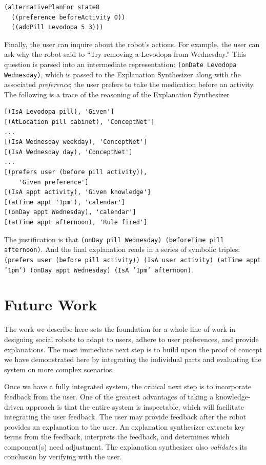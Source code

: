 \documentclass[letterpaper]{article} %
\begin{document}
\small{
\begin{verbatim}
(alternativePlanFor state8 
  ((preference beforeActivity 0)) 
  ((addPill Levodopa 5 3)))
\end{verbatim}}


Finally, the user can inquire about the robot's actions.  For example, the user can ask why the robot said to ``Try removing a Levodopa from Wednesday.''  This question is parsed into an intermediate representation: \texttt{(onDate Levodopa Wednesday)}, which is passed to the Explanation Synthesizer along with the associated \emph{preference}; the user prefers to take the medication before an activity.
The following is a trace of the reasoning of the Explanation Synthesizer

\small{
\begin{verbatim}
[(IsA Levodopa pill), 'Given']
[(AtLocation pill cabinet), 'ConceptNet']
...
[(IsA Wednesday weekday), 'ConceptNet']
[(IsA Wednesday day), 'ConceptNet']
...
[(prefers user (before pill activity)), 
    'Given preference']
[(IsA appt activity), 'Given knowledge']
[(atTime appt '1pm'), 'calendar']
[(onDay appt Wednesday), 'calendar']
[(atTime appt afternoon), 'Rule fired']
\end{verbatim}}

The justification is that \texttt{(onDay pill Wednesday) (beforeTime pill
afternoon)}.  And the final explanation reads in a series of symbolic
triples: \texttt{(prefers user (before pill activity)) (IsA user activity) (atTime appt '1pm') (onDay appt Wednesday) (IsA '1pm' afternoon)}.

\section{Future Work}
The work we describe here sets the foundation for a whole line of work in 
designing social robots to adapt to users, adhere to user preferences, and
provide explanations.  The most immediate next step is to build upon the
proof of concept we have demonstrated here by integrating the individual
parts and evaluating the system on more complex scenarios.

Once we have a fully integrated system, the critical next step is to 
incorporate feedback from the user.
One of the greatest advantages of taking a knowledge-driven approach is 
that the entire system is inspectable, which will facilitate integrating 
the user feedback.
The user may provide feedback after the robot provides an explanation to 
the user.  An explanation synthesizer extracts key terms from the
feedback, interprets the feedback, and determines which component(s)
need adjustment.  The explanation synthesizer also \emph{validates} its
conclusion by verifying with the user.
\end{document}
